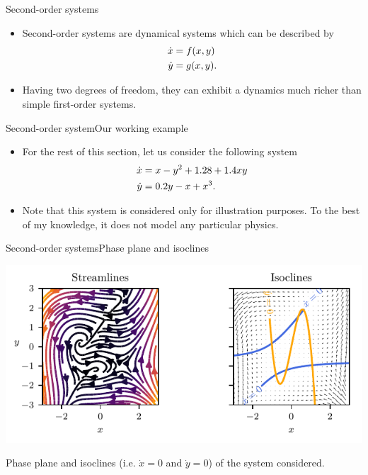 \documentclass[usenames,dvipsnames,svgnames,10pt,aspectratio=169]{beamer}
\begin{document}
\begin{frame}[t, c]{Second-order systems}{}
	\begin{itemize}
		\item Second-order systems are dynamical systems which can be described by
		\begin{equation}
			\begin{aligned}
				\dot{x} & = f(x, y) \\
				\dot{y} & = g(x, y).
			\end{aligned}
			\notag
		\end{equation}

		\bigskip

		\item Having two degrees of freedom, they can exhibit a dynamics much richer than simple first-order systems.
	\end{itemize}

	\vspace{1cm}
\end{frame}

\begin{frame}[t, c]{Second-order system}{Our working example}
	\begin{itemize}
		\item For the rest of this section, let us consider the following system
		\begin{equation}
			\begin{aligned}
				\dot{x} & = x - y^2 + 1.28 + 1.4 xy \\
				\dot{y} & = 0.2 y - x + x^3.
			\end{aligned}
			\notag
		\end{equation}

		\bigskip

		\item Note that this system is considered only for illustration purposes. To the best of my knowledge, it does not model any particular physics.
	\end{itemize}

	\vspace{1cm}
\end{frame}

\begin{frame}[t, c]{Second-order systems}{Phase plane and isoclines}
	\centering

	\includegraphics[width=.75\textwidth]{phase_plane_and_isoclines}

	Phase plane and isoclines (i.e. $\dot{x} = 0$ and $\dot{y} = 0$) of the system considered.

	\vspace{1cm}
\end{frame}
\end{document}
